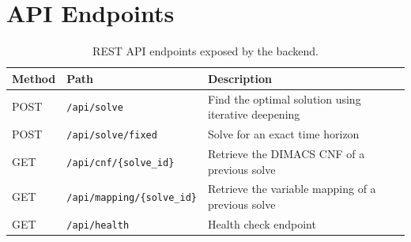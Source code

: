 \section{API Endpoints} \label{sec:api-endpoints}

\begin{table}[H]
    \centering
    \begin{tabular}{lll}
        \toprule
        \textbf{Method} & \textbf{Path}                       & \textbf{Description}                                \\
        \midrule
        POST            & \texttt{/api/solve}                 & Find the optimal solution using iterative deepening \\
        POST            & \texttt{/api/solve/fixed}           & Solve for an exact time horizon                     \\
        GET             & \texttt{/api/cnf/\{solve\_id\}}     & Retrieve the DIMACS CNF of a previous solve         \\
        GET             & \texttt{/api/mapping/\{solve\_id\}} & Retrieve the variable mapping of a previous solve   \\
        GET             & \texttt{/api/health}                & Health check endpoint                               \\
        \bottomrule
    \end{tabular}
    \caption{REST API endpoints exposed by the backend.}
    \label{tab:api-endpoints-table}
\end{table}

\newpage
